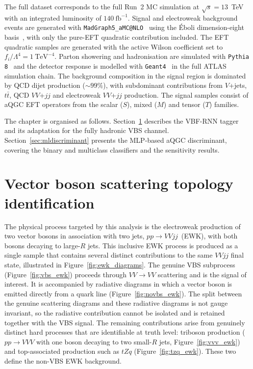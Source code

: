 The full dataset corresponds to the full Run~2 MC simulation at $\sqrt{s} = 13$~TeV with an integrated luminosity of $140~\text{fb}^{-1}$. Signal and electroweak background events are generated with \texttt{MadGraph5\_aMC@NLO}~\cite{Alwall:2014MG5} using the Éboli dimension-eight basis~\cite{Eboli_2016}, with only the pure-EFT quadratic contribution included. The EFT quadratic samples are generated with the active Wilson coefficient set to $f_i/\Lambda^4 = 1~\mathrm{TeV}^{-4}$. Parton showering and hadronisation are simulated with \texttt{Pythia 8}~\cite{Sjostrand:2015Pythia8} and the detector response is modelled with \texttt{Geant4}~\cite{Agostinelli:2003Geant4} in the full ATLAS simulation chain. The background composition in the signal region is dominated by QCD dijet production ($\sim\!99\%$), with subdominant contributions from $V$+jets, $t\bar{t}$, QCD $VV$+$jj$ and electroweak $VV$+$jj$ production. The signal samples consist of aQGC EFT operators from the scalar ($S$), mixed ($M$) and tensor ($T$) families.

The chapter is organised as follows. Section~\ref{sec:vbfrnn} describes the VBF-RNN tagger and its adaptation for the fully hadronic VBS channel. Section~\ref{sec:mldiscriminant} presents the MLP-based aQGC discriminant, covering the binary and multiclass classifiers and the sensitivity results.

\section{Vector boson scattering topology identification}
\label{sec:vbfrnn}

The physical process targeted by this analysis is the electroweak production of two vector bosons in association with two jets, $pp \to VVjj$~(EWK), with both bosons decaying to large-$R$ jets. This inclusive EWK process is produced as a single sample that contains several distinct contributions to the same $VVjj$ final state, illustrated in Figure~\ref{fig:ewk_diagrams}. The genuine VBS subprocess (Figure~\ref{fig:vbs_ewk}) proceeds through $VV \to VV$ scattering and is the signal of interest. It is accompanied by radiative diagrams in which a vector boson is emitted directly from a quark line (Figure~\ref{fig:novbs_ewk}). The split between the genuine scattering diagrams and these radiative diagrams is not gauge invariant, so the radiative contribution cannot be isolated and is retained together with the VBS signal. The remaining contributions arise from genuinely distinct hard processes that are identifiable at truth level: triboson production ($pp \to VVV$ with one boson decaying to two small-$R$ jets, Figure~\ref{fig:vvv_ewk}) and top-associated production such as $tZq$ (Figure~\ref{fig:tzq_ewk}). These two define the non-VBS EWK background.

